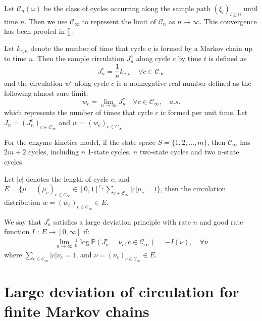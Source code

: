 \documentclass[11pt,en,cite=authoryear]{elegantpaper}
\begin{document}
\begin{definition}
    Let $\mathcal{C}_n(\omega)$ be the class of cycles occurring along the sample path $(\xi_l)_{l\ge 0}$ until time $n$. Then we use $\mathcal{C}_{\infty}$ to represent the limit of $\mathcal{C}_n$ as $n \rightarrow \infty$. This convergence has been proofed in [].
\end{definition}

\begin{definition} %
    Let $k_{c, n}$ denote the number of time that cycle c is formed by a Markov chain up to time $n$. Then the sample circulation $J_{n}^c$ along cycle $c$ by time $t$ is defined as
    $$
    J_{n}^c = \frac{1}{n} k_{c, n} \quad \forall c \in \mathcal{C}_{\infty}
    $$
    and the circulation $w^c$ along cycle $c$ is a nonnegative real number defined as the following almost sure limit:
    $$
    w_c = \lim_{n \rightarrow \infty} J_{n}^c \quad \forall c \in \mathcal{C}_{\infty}, \quad a.s.
    $$
    which represents the number of times that cycle $c$ ic formed per unit time. Let $J_n = (J_n^c)_{c \in C_{\infty}}$ and $w =  (w_c)_{c \in C_{\infty}}$.
\end{definition}

For the enzyme kinetics model, if the state space $S=\{1, 2, \dots, m\}$, then $\mathcal{C}_{\infty}$ has $2m+2$ cycles, including $n$ 1-state cycles, $n$ two-state cycles and two n-state cycles

Let $|c|$ denotes the length of cycle $c$, and 
$E = \{\mu=(\mu_c)_{c\in \mathcal{C}_{\infty}} \in [0, 1]^r :\sum_{c \in \mathcal{C}_{\infty}} |c| \mu_c  = 1\}$, then the circulation distribution $w = (w_{c})_{c \in \mathcal{C}_{\infty}} \in E$.

\begin{definition}
    We say that $J_{n}^c$ satisfies a large deviation principle with rate $n$ and good rate function $I$ : $E \rightarrow [0, \infty]$ if:
    \begin{align}
        \lim_{n \rightarrow \infty} \frac{1}{n} \log \mathbb{P}(J_{n}^c = \nu_c , c \in \mathcal{C}_{\infty}) = - I(\nu), \quad \forall \nu
    \end{align}
    where $\sum_{c \in \mathcal{C}_{\infty}} |c| \nu_c = 1$, 
    and $\nu = (\nu_c)_{c \in \mathcal{C}_{\infty}} \in E$.
\end{definition}


\section{Large deviation of circulation for finite Markov chains}
\end{document}
